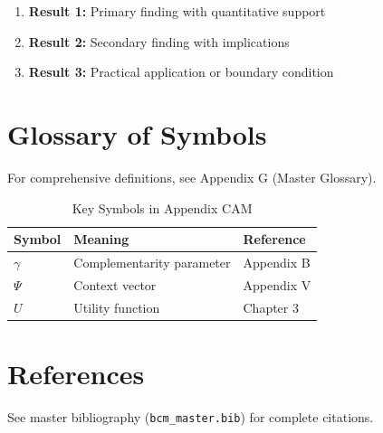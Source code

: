 \begin{enumerate}
    \item \textbf{Result 1:} Primary finding with quantitative support
    \item \textbf{Result 2:} Secondary finding with implications
    \item \textbf{Result 3:} Practical application or boundary condition
\end{enumerate}

\section{Glossary of Symbols}
\label{sec:cam-glossary}

For comprehensive definitions, see Appendix G (Master Glossary).

\begin{table}[htbp]
\centering
\caption{Key Symbols in Appendix CAM}
\begin{tabular}{lll}
\toprule
\textbf{Symbol} & \textbf{Meaning} & \textbf{Reference} \\
\midrule
$\gamma$ & Complementarity parameter & Appendix B \\
$\Psi$ & Context vector & Appendix V \\
$U$ & Utility function & Chapter 3 \\
\bottomrule
\end{tabular}
\end{table}


\section{References}
\label{sec:cam-references}

See master bibliography (\texttt{bcm\_master.bib}) for complete citations.

\nocite{bcm_master}

